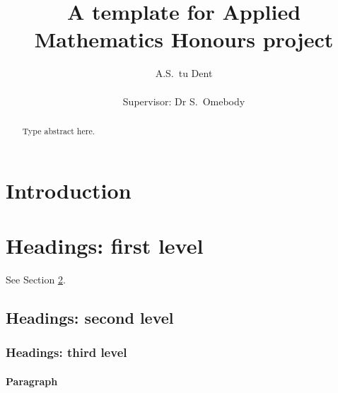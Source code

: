 \documentclass[12pt,a4paper]{article}
\title{A template for Applied Mathematics Honours project}
\author{A.S.\ tu Dent\\ %
\hspace*{0cm}\\
Supervisor: Dr S.\ Omebody}
\date{} %
\theoremstyle{definition}
\begin{document}
\maketitle %

\begin{abstract}
Type abstract here.
\lipsum[1]
\end{abstract}

\section{Introduction}
\lipsum[2]
\lipsum[3]

\section{Headings: first level}
\label{sec:headings}

\lipsum[4] See Section \ref{sec:headings}.

\subsection{Headings: second level}
\lipsum[5] 

\subsubsection{Headings: third level}
\lipsum[6]

\paragraph{Paragraph}
\lipsum[7]
\end{document}
